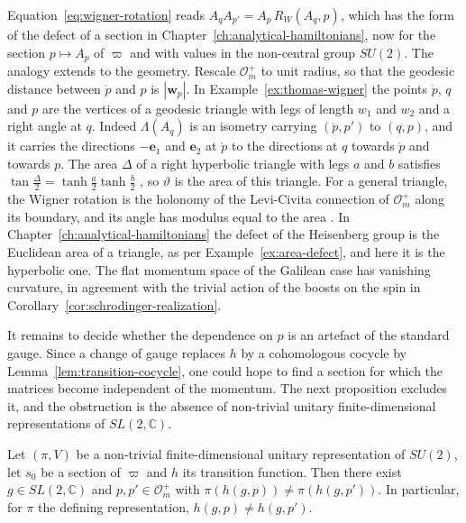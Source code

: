 \begin{remark}
	Equation~\eqref{eq:wigner-rotation} reads $A_qA_{p'}=A_p\,R_W(A_q,p)$, which has the form of the defect of a section in Chapter~\ref{ch:analytical-hamiltonians}, now for the section $p\mapsto A_p$ of $\varpi$ and with values in the non-central group $SU(2)$. The analogy extends to the geometry. Rescale $\mathcal{O}_m^+$ to unit radius, so that the geodesic distance between $\mathring{p}$ and $p$ is $|\mathbf{w}_p|$. In Example~\ref{ex:thomas-wigner} the points $\mathring{p}$, $q$ and $p$ are the vertices of a geodesic triangle with legs of length $w_1$ and $w_2$ and a right angle at $q$. Indeed $\Lambda(A_q)$ is an isometry carrying $(\mathring{p},p')$ to $(q,p)$, and it carries the directions $-\mathbf{e}_1$ and $\mathbf{e}_2$ at $\mathring{p}$ to the directions at $q$ towards $\mathring{p}$ and towards $p$. The area $\Delta$ of a right hyperbolic triangle with legs $a$ and $b$ satisfies $\tan\tfrac\Delta2=\tanh\tfrac a2\tanh\tfrac b2$ \cite[TODO-location]{TODO-Ratcliffe}, so $\vartheta$ is the area of this triangle. For a general triangle, the Wigner rotation is the holonomy of the Levi-Civita connection of $\mathcal{O}_m^+$ along its boundary, and its angle has modulus equal to the area \cite[TODO-location]{TODO-Aravind1997}. In Chapter~\ref{ch:analytical-hamiltonians} the defect of the Heisenberg group is the Euclidean area of a triangle, as per Example~\ref{ex:area-defect}, and here it is the hyperbolic one. The flat momentum space of the Galilean case has vanishing curvature, in agreement with the trivial action of the boosts on the spin in Corollary~\ref{cor:schrodinger-realization}.
\end{remark}

It remains to decide whether the dependence on $p$ is an artefact of the standard gauge. Since a change of gauge replaces $h$ by a cohomologous cocycle by Lemma~\ref{lem:transition-cocycle}, one could hope to find a section for which the matrices become independent of the momentum. The next proposition excludes it, and the obstruction is the absence of non-trivial unitary finite-dimensional representations of $SL(2,\mathbb{C})$.

\begin{proposition}\label{prop:wigner-no-gauge}
	Let $(\pi,V)$ be a non-trivial finite-dimensional unitary representation of $SU(2)$, let $s_0$ be a section of $\varpi$ and $h$ its transition function. Then there exist $g\in SL(2,\mathbb{C})$ and $p,p'\in\mathcal{O}_m^+$ with $\pi(h(g,p))\neq\pi(h(g,p'))$. In particular, for $\pi$ the defining representation, $h(g,p)\neq h(g,p')$.
\end{proposition}

